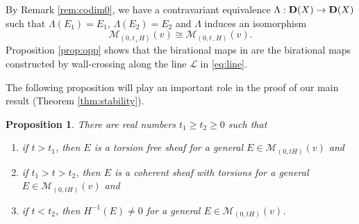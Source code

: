 \documentclass[10pt]{amsart}
\def\cal{\mathcal}
\numberwithin{equation}{section}
\theoremstyle{plain}
\newtheorem{prop}[thm]{Proposition}
\theoremstyle{definition}
\theoremstyle{remark}
\begin{document}
By Remark \ref{rem:codim0},
we have a contravariant equivalence
$\Lambda:
{\bf D}(X) \to {\bf D}(X)$
such that $\Lambda(E_1)=E_1$, $\Lambda(E_2)=E_2$
and $\Lambda$ induces an isomorphism
\begin{equation}
{\cal M}_{(0,t_+ H)}(v){ \cong \cal M}_{(0,t_- H)}(v).
\end{equation}
Proposition \ref{prop:opp} shows that the birational maps in \cite{Y:abel}
are the birational maps constructed by wall-crossing along the line 
${\cal L}$ in \eqref{eq:line}.

The following proposition will play an important role in the proof of
our main result (Theorem \ref{thm:stability}).

\begin{prop}\label{prop:t_0}
There are real numbers $t_1 \geq t_2 \geq 0$ such that
\begin{enumerate}
\item
if $t>t_1$, then 
$E$ is a torsion free sheaf for a general $E \in {\cal M}_{(0,tH)}(v)$ and
\item
if $t_1>t>t_2$, then
$E$ is a coherent sheaf with torsions for a general
$E \in {\cal M}_{(0,tH)}(v)$ and
\item
if $t<t_2$, then
 $H^{-1}(E) \ne 0$ for a general $E \in {\cal M}_{(0,tH)}(v)$.
\end{enumerate}
\end{prop}
\end{document}
